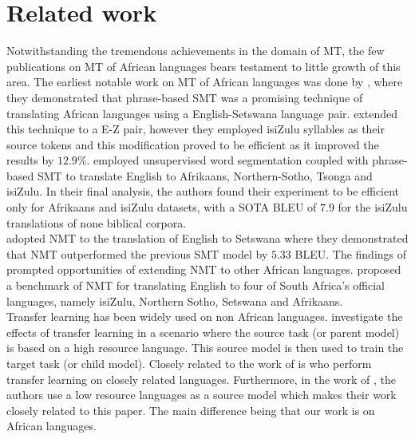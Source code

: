 \documentclass[11pt,a4paper]{article}
\begin{document}
\section{Related work}\label{sec: related_work}
Notwithstanding the tremendous achievements in the domain of MT, the few publications on MT of African languages bears testament to little growth of this area. The earliest notable work on MT of African languages was done by \citet{wilken2012developing}, where they demonstrated that phrase-based SMT was a promising technique of translating African languages using a English-Setswana language pair. \citet{wolff2014experiments} extended this technique to a E-Z pair, however they employed isiZulu syllables as their source tokens and this modification proved to be efficient as it improved the results by $12.9\%$. \citet{van2014exploring} employed unsupervised word segmentation coupled with phrase-based SMT to translate English to Afrikaans, Northern-Sotho, Tsonga and isiZulu. In their final analysis, the authors found their experiment to be efficient only for Afrikaans and isiZulu datasets, with a SOTA BLEU of $7.9$ for the isiZulu translations of none biblical corpora.\\ \indent \citet{abbott2018towards} adopted NMT to the translation of English to Setswana where they demonstrated that NMT outperformed the previous SMT \cite{wilken2012developing} model by $5.33$ BLEU. The findings of \citet{abbott2018towards} prompted opportunities of extending NMT to other African languages. \citet{martinus2019benchmarking} proposed a benchmark of NMT for translating English to four of South Africa's official languages, namely isiZulu,  Northern Sotho,  Setswana and Afrikaans.\\
\indent Transfer learning has been widely used on non African languages. \citet{zoph2016transfer} investigate the effects of transfer learning in a scenario where the source task (or parent model) is based on a high resource language. This source model is then used to train the target task (or child model). Closely related to the work of \citet{zoph2016transfer} is \citet{nguyen2017transfer} who perform transfer learning on closely related languages. Furthermore, in the work of \citet{nguyen2017transfer}, the authors use a low resource languages as a source model which makes their work closely related to this paper. The main difference being that our work is on African languages.
\end{document}
